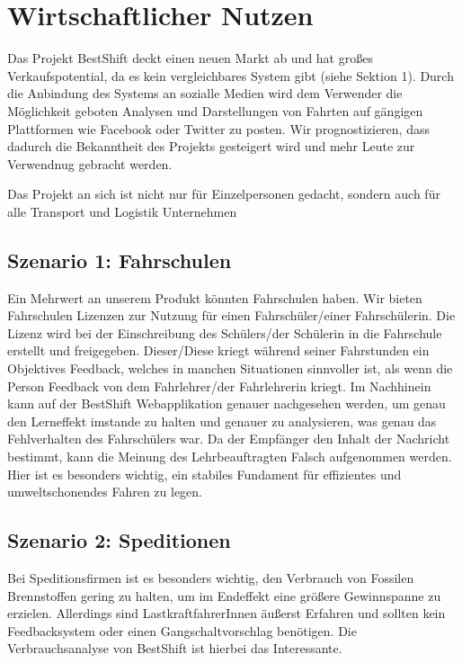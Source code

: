 \section{Wirtschaftlicher Nutzen}
\label{sec:wirt}

Das Projekt BestShift deckt einen neuen Markt ab und hat großes Verkaufspotential, da es kein vergleichbares System gibt (siehe Sektion 1). Durch die Anbindung des Systems an sozialle Medien wird dem Verwender die Möglichkeit geboten Analysen und Darstellungen von Fahrten auf gängigen Plattformen wie Facebook oder Twitter zu posten. Wir prognostizieren, dass dadurch die Bekanntheit des Projekts gesteigert wird und mehr Leute zur Verwendnug gebracht werden. 

Das Projekt an sich ist nicht nur für Einzelpersonen gedacht, sondern auch für alle Transport und Logistik Unternehmen

\subsection{Szenario 1: Fahrschulen}
Ein Mehrwert an unserem Produkt könnten Fahrschulen haben. Wir bieten Fahrschulen
Lizenzen zur Nutzung für einen Fahrschüler/einer Fahrschülerin. Die Lizenz wird bei der Einschreibung des
Schülers/der Schülerin in die Fahrschule erstellt und freigegeben. Dieser/Diese kriegt während seiner
Fahrstunden ein Objektives Feedback, welches in manchen Situationen sinnvoller ist,
als wenn die Person Feedback von dem Fahrlehrer/der Fahrlehrerin kriegt.
Im Nachhinein kann auf der BestShift Webapplikation genauer nachgesehen werden,
um genau den Lerneffekt imstande zu halten und genauer zu analysieren, was genau
das Fehlverhalten des Fahrschülers war.
Da der Empfänger den Inhalt der Nachricht bestimmt, kann die Meinung des Lehrbeauftragten
Falsch aufgenommen werden. Hier ist es besonders wichtig, ein stabiles Fundament für 
effizientes und umweltschonendes Fahren zu legen. 


\subsection{Szenario 2: Speditionen}
Bei Speditionsfirmen ist es besonders wichtig, den Verbrauch von Fossilen Brennstoffen gering zu halten, um
im Endeffekt eine größere Gewinnspanne zu erzielen. Allerdings sind LastkraftfahrerInnen äußerst Erfahren und
sollten kein Feedbacksystem oder einen Gangschaltvorschlag benötigen. Die Verbrauchsanalyse von BestShift ist hierbei
das Interessante.


